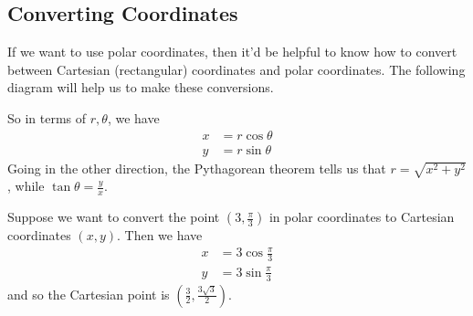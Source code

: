 \documentclass[10pt,]{book}
\theoremstyle{ptxplainnotitle}
\theoremstyle{ptxplaintitle}
\theoremstyle{ptxplainnotitle}
\theoremstyle{ptxplaintitle}
\theoremstyle{ptxplainnotitle}
\theoremstyle{ptxplaintitle}
\theoremstyle{ptxdefinitionnotitle}
\theoremstyle{ptxdefinitiontitle}
\theoremstyle{ptxdefinitionnotitle}
\theoremstyle{ptxdefinitiontitle}
\theoremstyle{ptxdefinitionnotitle}
\theoremstyle{ptxdefinitiontitle}
\theoremstyle{ptxdefinitionnotitle}
\theoremstyle{ptxdefinitiontitle}
\theoremstyle{ptxdefinitionnotitle}
\theoremstyle{ptxdefinitiontitle}
\numberwithin{equation}{section}
\begin{document}
\subsection[{Converting Coordinates}]{Converting Coordinates}\label{subsection-converting-coordinates}
\hypertarget{p-676}{}%
If we want to use polar coordinates, then it'd be helpful to know how to convert between Cartesian (rectangular) coordinates and polar coordinates. The following diagram will help us to make these conversions.%
\begin{figure}
\centering
{
}
\end{figure}
\hypertarget{p-677}{}%
So in terms of \(r,\theta\), we have%
%
\begin{align*}
x & = r\cos\theta \\
y & = r\sin\theta 
\end{align*}
\hypertarget{p-678}{}%
Going in the other direction, the Pythagorean theorem tells us that \(r = \sqrt{x^{2}+y^{2}}\), while \(\tan\theta = \frac{y}{x}\).%
\begin{example}\label{example-converting-polar-to-cartesian}
\hypertarget{p-679}{}%
Suppose we want to convert the point \((3,\frac{\pi}{3})\) in polar coordinates to Cartesian coordinates \((x,y)\). Then we have%
%
\begin{align*}
x & = 3\cos\frac{\pi}{3} \\
y & = 3\sin\frac{\pi}{3} 
\end{align*}
\hypertarget{p-680}{}%
and so the Cartesian point is \((\frac{3}{2},\frac{3\sqrt{3}}{2}).\)%
\end{example}
\end{document}
